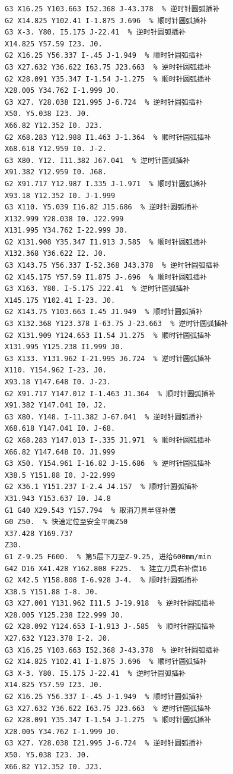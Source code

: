 \documentclass{xautCADreport}
\begin{document}
\begin{lstlisting}[language={}, title={工序50-凸模.nc（完整程序）}, basicstyle=\ttfamily\tiny]
G3 X16.25 Y103.663 I52.368 J-43.378  % 逆时针圆弧插补
G2 X14.825 Y102.41 I-1.875 J.696  % 顺时针圆弧插补
G3 X-3. Y80. I5.175 J-22.41  % 逆时针圆弧插补
X14.825 Y57.59 I23. J0.
G2 X16.25 Y56.337 I-.45 J-1.949  % 顺时针圆弧插补
G3 X27.632 Y36.622 I63.75 J23.663  % 逆时针圆弧插补
G2 X28.091 Y35.347 I-1.54 J-1.275  % 顺时针圆弧插补
X28.005 Y34.762 I-1.999 J0.
G3 X27. Y28.038 I21.995 J-6.724  % 逆时针圆弧插补
X50. Y5.038 I23. J0.
X66.82 Y12.352 I0. J23.
G2 X68.283 Y12.988 I1.463 J-1.364  % 顺时针圆弧插补
X68.618 Y12.959 I0. J-2.
G3 X80. Y12. I11.382 J67.041  % 逆时针圆弧插补
X91.382 Y12.959 I0. J68.
G2 X91.717 Y12.987 I.335 J-1.971  % 顺时针圆弧插补
X93.18 Y12.352 I0. J-1.999
G3 X110. Y5.039 I16.82 J15.686  % 逆时针圆弧插补
X132.999 Y28.038 I0. J22.999
X131.995 Y34.762 I-22.999 J0.
G2 X131.908 Y35.347 I1.913 J.585  % 顺时针圆弧插补
X132.368 Y36.622 I2. J0.
G3 X143.75 Y56.337 I-52.368 J43.378  % 逆时针圆弧插补
G2 X145.175 Y57.59 I1.875 J-.696  % 顺时针圆弧插补
G3 X163. Y80. I-5.175 J22.41  % 逆时针圆弧插补
X145.175 Y102.41 I-23. J0.
G2 X143.75 Y103.663 I.45 J1.949  % 顺时针圆弧插补
G3 X132.368 Y123.378 I-63.75 J-23.663  % 逆时针圆弧插补
G2 X131.909 Y124.653 I1.54 J1.275  % 顺时针圆弧插补
X131.995 Y125.238 I1.999 J0.
G3 X133. Y131.962 I-21.995 J6.724  % 逆时针圆弧插补
X110. Y154.962 I-23. J0.
X93.18 Y147.648 I0. J-23.
G2 X91.717 Y147.012 I-1.463 J1.364  % 顺时针圆弧插补
X91.382 Y147.041 I0. J2.
G3 X80. Y148. I-11.382 J-67.041  % 逆时针圆弧插补
X68.618 Y147.041 I0. J-68.
G2 X68.283 Y147.013 I-.335 J1.971  % 顺时针圆弧插补
X66.82 Y147.648 I0. J1.999
G3 X50. Y154.961 I-16.82 J-15.686  % 逆时针圆弧插补
X38.5 Y151.88 I0. J-22.999
G2 X36.1 Y151.237 I-2.4 J4.157  % 顺时针圆弧插补
X31.943 Y153.637 I0. J4.8
G1 G40 X29.543 Y157.794  % 取消刀具半径补偿
G0 Z50.  % 快速定位至安全平面Z50
X37.428 Y169.737
Z30.
G1 Z-9.25 F600.  % 第5层下刀至Z-9.25, 进给600mm/min
G42 D16 X41.428 Y162.808 F225.  % 建立刀具右补偿16
G2 X42.5 Y158.808 I-6.928 J-4.  % 顺时针圆弧插补
X38.5 Y151.88 I-8. J0.
G3 X27.001 Y131.962 I11.5 J-19.918  % 逆时针圆弧插补
X28.005 Y125.238 I22.999 J0.
G2 X28.092 Y124.653 I-1.913 J-.585  % 顺时针圆弧插补
X27.632 Y123.378 I-2. J0.
G3 X16.25 Y103.663 I52.368 J-43.378  % 逆时针圆弧插补
G2 X14.825 Y102.41 I-1.875 J.696  % 顺时针圆弧插补
G3 X-3. Y80. I5.175 J-22.41  % 逆时针圆弧插补
X14.825 Y57.59 I23. J0.
G2 X16.25 Y56.337 I-.45 J-1.949  % 顺时针圆弧插补
G3 X27.632 Y36.622 I63.75 J23.663  % 逆时针圆弧插补
G2 X28.091 Y35.347 I-1.54 J-1.275  % 顺时针圆弧插补
X28.005 Y34.762 I-1.999 J0.
G3 X27. Y28.038 I21.995 J-6.724  % 逆时针圆弧插补
X50. Y5.038 I23. J0.
X66.82 Y12.352 I0. J23.

\end{lstlisting}
\end{document}
